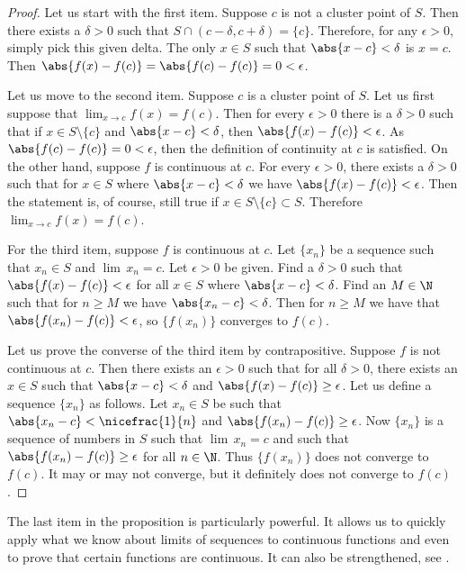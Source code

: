 \documentclass[12pt]{book}
\begin{document}
\begin{proof}
Let us start with the first item.
Suppose $c$ is not a cluster point of
$S$.
Then there exists a $\delta > 0$
such that $S \cap (c-\delta,c+\delta) = \{
c \}$.
Therefore, for any $\epsilon > 0$, simply pick this given delta.
The only $x \in S$ such that $\abs{x-c} < \delta$ is $x=c$.
Then
$\abs{f(x)-f(c)} = \abs{f(c)-f(c)} = 0 < \epsilon$.

Let us move to the second item.
Suppose $c$ is a cluster point of $S$.
Let us first suppose
that $\lim_{x\to c} f(x) = f(c)$.
Then for every $\epsilon > 0$
there is a $\delta > 0$ such that if $x \in S \setminus \{ c \}$
and $\abs{x-c} < \delta$, then $\abs{f(x)-f(c)} < \epsilon$.
As
$\abs{f(c)-f(c)} = 0 < \epsilon$, then the definition of continuity at
$c$ is satisfied.
On the other hand, suppose $f$ is continuous
at $c$.
For every $\epsilon > 0$, there exists a $\delta > 0$
such that for $x \in S$ where $\abs{x-c} < \delta$ we have
$\abs{f(x)-f(c)} < \epsilon$.
Then the statement is, of course, still true if
$x \in S \setminus \{ c \} \subset S$.
Therefore $\lim_{x\to c} f(x) =
f(c)$.

For the third item, suppose $f$ is continuous at $c$.
Let $\{ x_n \}$
be a sequence such that $x_n \in S$ and $\lim\, x_n = c$.
Let $\epsilon > 0$
be given.
Find a $\delta > 0$ such that $\abs{f(x)-f(c)} < \epsilon$
for all $x \in S$ where $\abs{x-c} < \delta$.
Find an $M \in \N$
such that for $n \geq M$ we have $\abs{x_n-c} < \delta$.
Then for
$n \geq M$ we have that $\abs{f(x_n)-f(c)} < \epsilon$, so $\{ f(x_n) \}$
converges to $f(c)$.

Let us prove the converse of the third item by contrapositive.
Suppose $f$ is not
continuous at $c$.
Then there exists an $\epsilon > 0$
such that for all $\delta > 0$, there exists an $x \in S$
such that $\abs{x-c} < \delta$ and $\abs{f(x)-f(c)} \geq \epsilon$.
Let us define a sequence $\{ x_n \}$ as follows.
Let $x_n \in S$ be such that $\abs{x_n-c} < \nicefrac{1}{n}$
and $\abs{f(x_n)-f(c)} \geq \epsilon$.
Now $\{ x_n \}$ is
a sequence of numbers in $S$ such that
$\lim\, x_n = c$ and such that
$\abs{f(x_n)-f(c)} \geq \epsilon$ for all $n \in \N$.
Thus $\{ f(x_n) \}$
does not converge to $f(c)$.
It may or may not converge, but it definitely
does not converge to $f(c)$.  
\end{proof}

The last item in the proposition is particularly powerful.
It allows us to
quickly apply what we know about limits of sequences to continuous functions
and even to prove that certain functions are continuous.
It can also be strengthened, see .
\end{document}
